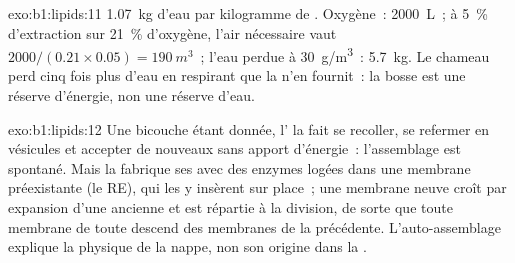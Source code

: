 \begin{solution}{exo:b1:lipids:11}
\qty{1.07}{kg} d'eau par kilogramme de . Oxygène~: \qty{2000}{L}~;
à \qty{5}{\%} d'extraction sur \qty{21}{\%} d'oxygène, l'air nécessaire
vaut $2000/(0.21\times 0.05) = \qty{190}{m^3}$~; l'eau perdue à
\qty{30}{g/m^3}~: \qty{5.7}{kg}. Le chameau perd cinq fois plus d'eau en
respirant que la  n'en fournit~: la bosse est une réserve
d'énergie, non une réserve d'eau.
\end{solution}

\begin{solution}{exo:b1:lipids:12}
Une bicouche étant donnée, l' la fait se recoller, se
refermer en vésicules et accepter de nouveaux  sans apport
d'énergie~: l'assemblage est spontané. Mais la  fabrique ses
 avec des enzymes logées dans une membrane préexistante (le RE),
qui les y insèrent sur place~; une membrane neuve croît par expansion
d'une ancienne et est répartie à la division, de sorte que toute
membrane de toute  descend des membranes de la 
précédente. L'auto-assemblage explique la physique de la nappe, non son
origine dans la .
\end{solution}

